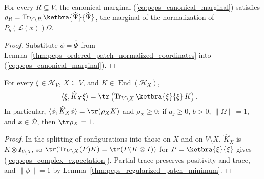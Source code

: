 \begin{lemma}
    \label{thm:peps_ordered_patch_marginal_coordinates}
    \leanok
    For every $R\subseteq V$, the canonical marginal (\ref{eq:peps_canonical_marginal}) satisfies
    $\rho_R=\operatorname{Tr}_{V\setminus R}\ketbra{\widehat\Psi}{\widehat\Psi}$, the marginal of the normalization of $P_b(\mathcal L(x))\Omega$.
\end{lemma}
\begin{proof}
    \leanok
    Substitute $\phi=\widehat\Psi$ from Lemma~\ref{thm:peps_ordered_patch_normalized_coordinates} into (\ref{eq:peps_canonical_marginal}).
\end{proof}

\begin{lemma}
    \label{thm:peps_patch_marginal_expectation}
    \leanok
    For every $\xi\in\mathcal H_V$, $X\subseteq V$, and $K\in\operatorname{End}(\mathcal H_X)$,
    \begin{align}
        \langle\xi,\widehat K_X\xi\rangle
         & =\tr\left(\operatorname{Tr}_{V\setminus X}
        \ketbra{\xi}{\xi}\,K\right).
        \label{eq:peps_complex_expectation}
    \end{align}
    In particular, $\langle\phi,\widehat K_X\phi\rangle=\tr(\rho_XK)$ and $\rho_X\ge0$; if $a_j\ge0$, $b>0$,
    $\|\Omega\|=1$, and $x\in\mathcal D$, then $\tr\rho_X=1$.
\end{lemma}
\begin{proof}
    \leanok
    In the splitting of configurations into those on $X$ and on $V\setminus X$, $\widehat K_X$ is $K\otimes I_{V\setminus X}$, so $\tr(\operatorname{Tr}_{V\setminus X}(P)K)=\tr(P(K\otimes I))$ for $P=\ketbra{\xi}{\xi}$ gives (\ref{eq:peps_complex_expectation}). Partial trace preserves positivity and trace, and $\|\phi\|=1$ by Lemma~\ref{thm:peps_regularized_patch_minimum}.
\end{proof}

